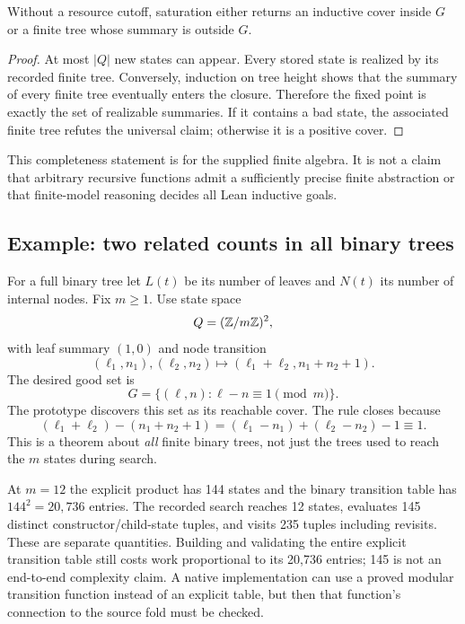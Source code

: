 \begin{theorem}
Without a resource cutoff, saturation either returns an inductive cover inside
$G$ or a finite tree whose summary is outside $G$.
\end{theorem}
\begin{proof}
At most $|Q|$ new states can appear. Every stored state is realized by its
recorded finite tree. Conversely, induction on tree height shows that the
summary of every finite tree eventually enters the closure. Therefore the
fixed point is exactly the set of realizable summaries. If it contains a bad
state, the associated finite tree refutes the universal claim; otherwise it is
a positive cover.
\end{proof}

This completeness statement is for the supplied finite algebra. It is not a
claim that arbitrary recursive functions admit a sufficiently precise finite
abstraction or that finite-model reasoning decides all Lean inductive goals.

\subsection{Example: two related counts in all binary trees}
For a full binary tree let $L(t)$ be its number of leaves and $N(t)$ its number
of internal nodes. Fix $m\ge1$. Use state space
\[
 Q=(\mathbb{Z}/m\mathbb{Z})^2,
\]
with leaf summary $(1,0)$ and node transition
\[
 (\ell_1,n_1),(\ell_2,n_2)
 \longmapsto (\ell_1+\ell_2,n_1+n_2+1).
\]
The desired good set is
\[
 G=\{(\ell,n):\ell-n\equiv1\pmod m\}.
\]
The prototype discovers this set as its reachable cover. The rule closes
because
\[
 (\ell_1+\ell_2)-(n_1+n_2+1)
 =(\ell_1-n_1)+(\ell_2-n_2)-1\equiv1.
\]
This is a theorem about \emph{all} finite binary trees, not just the trees used
to reach the $m$ states during search.

At $m=12$ the explicit product has 144 states and the binary transition table
has $144^2=20{,}736$ entries. The recorded search reaches 12 states, evaluates
145 distinct constructor/child-state tuples, and visits 235 tuples including
revisits. These are separate quantities. Building and validating the entire
explicit transition table still costs work proportional to its 20,736 entries;
145 is not an end-to-end complexity claim. A native implementation can use a
proved modular transition function instead of an explicit table, but then that
function's connection to the source fold must be checked.

